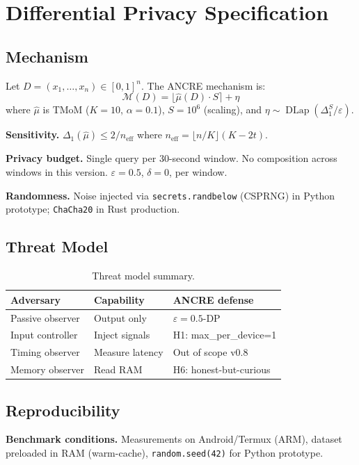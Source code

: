 \section{Differential Privacy Specification}

\subsection{Mechanism}
Let $D = (x_1,\ldots,x_n) \in [0,1]^n$.
The ANCRE mechanism is:
\[
\mathcal{M}(D) =
\lfloor \hat{\mu}(D) \cdot S \rceil + \eta
\]
where $\hat{\mu}$ is TMoM ($K=10$, $\alpha=0.1$),
$S=10^6$ (scaling), and
$\eta \sim \operatorname{DLap}(\Delta_1^S/\varepsilon)$.

\textbf{Sensitivity.}
$\Delta_1(\hat{\mu}) \leq 2/n_{\mathrm{eff}}$
where $n_{\mathrm{eff}} = \lfloor n/K \rfloor (K-2t)$.

\textbf{Privacy budget.}
Single query per 30-second window.
No composition across windows in this version.
$\varepsilon=0.5$, $\delta=0$, per window.

\textbf{Randomness.}
Noise injected via \texttt{secrets.randbelow}
(CSPRNG) in Python prototype;
\texttt{ChaCha20} in Rust production.

\subsection{Threat Model}

\begin{table}[h]
\centering
\begin{tabular}{lll}
\toprule
Adversary & Capability & ANCRE defense \\
\midrule
Passive observer & Output only & $\varepsilon=0.5$-DP \\
Input controller & Inject signals & H1: max\_per\_device=1 \\
Timing observer & Measure latency & Out of scope v0.8 \\
Memory observer & Read RAM & H6: honest-but-curious \\
\bottomrule
\end{tabular}
\caption{Threat model summary.}
\end{table}

\subsection{Reproducibility}

\textbf{Benchmark conditions.}
Measurements on Android/Termux (ARM),
dataset preloaded in RAM (warm-cache),
\texttt{random.seed(42)} for Python prototype.

